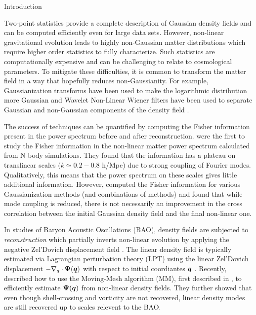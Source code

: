 \begin{section}{Introduction}\label{sec:introduction}  

  Two-point statistics provide a complete description of Gaussian
  density fields and can be computed efficiently even for large data
  sets.  However, non-linear gravitational evolution leads to highly
  non-Gaussian matter distributions which require higher order
  statistics to fully characterize.  Such statistics are
  computationally expensive and can be challenging to relate to
  cosmological parameters.  To mitigate these difficulties, it is
  common to transform the matter field in a way that hopefully reduces
  non-Gaussianity.  For example, Gaussianization transforms have been
  used to make the logarithmic distribution more Gaussian
  \cite{bib:Weinberg1992,bib:Mark2009} and Wavelet Non-Linear Wiener
  filters have been used to separate Gaussian and non-Gaussian
  components of the density field
  \cite{bib:Zhang2011,bib:Yu2012,bib:HarnoisD2013}.

  The success of techniques can be quantified by computing the Fisher
  information present in the power spectrum before and after
  reconstruction.  \citet{bib:Rimes2006}
  were the first to study the Fisher information in the non-linear
  matter power spectrum calculated from N-body simulations.  They
  found that the information has a plateau on translinear scales
  ($k \simeq 0.2-0.8$ h/Mpc) due to strong coupling of Fourier
  modes.  Qualitatively, this means that the power spectrum on these
  scales gives little additional information.  
  However, \citet{bib:HarnoisD2013} computed the Fisher information
  for various Gaussianization methods (and combinations of methods)
  and found that while mode coupling is reduced, there is not
  necessarily an improvement in the cross correlation between the
  initial Gaussian density field and the final non-linear one. 

  In studies of Baryon Acoustic Oscillations (BAO), density fields are
  subjected to {\it reconstruction} which partially inverts non-linear
  evolution by applying the negative Zel'Dovich displacement field \cite{bib:Eisenstein2007}.
  The linear density field is
  typically estimated via Lagrangian perturbation theory (LPT)
  using the linear Zel'Dovich displacement $-\nabla_q\cdot\boldsymbol\Psi(\boldsymbol q)$
  with respect to initial coordiantes $\boldsymbol{q}$ \cite{bib:Zel1970}.
  Recently, \citet{bib:Zhu2016} described how to use the Moving-Mesh
  algorithm (MM), first described in \cite{bib:Pen1995,bib:Pen1998},
  to efficiently estimate $\boldsymbol{\Psi}(\boldsymbol{q})$ from non-linear
  density fields.  They further showed that even though shell-crossing
  and vorticity are not recovered, linear density modes are still 
  recovered up to scales relevent to the BAO.


\end{section}
